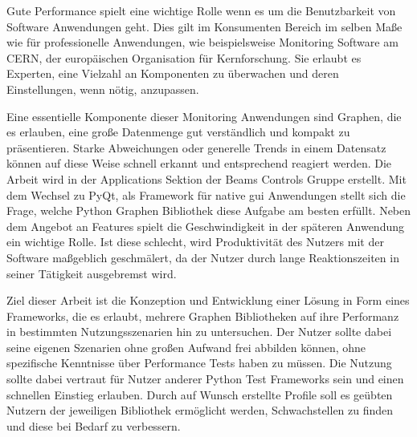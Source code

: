 

\Abstract

Gute Performance spielt eine wichtige Rolle wenn es um die  Benutzbarkeit von
Software Anwendungen geht. Dies gilt im Konsumenten Bereich im selben Maße wie
für professionelle Anwendungen, wie beispielsweise Monitoring Software am CERN,
der europäischen Organisation für Kernforschung. Sie erlaubt es Experten, eine
Vielzahl an Komponenten zu überwachen und deren Einstellungen, wenn nötig,
anzupassen.

Eine essentielle Komponente dieser Monitoring Anwendungen sind Graphen, die es
erlauben, eine große Datenmenge gut verständlich und kompakt zu präsentieren.
Starke Abweichungen oder generelle Trends in einem Datensatz können auf diese
Weise schnell erkannt und entsprechend reagiert werden. Die Arbeit wird in der
Applications Sektion der Beams Controls Gruppe erstellt. Mit dem Wechsel zu
PyQt, als Framework für native \gls{gui} Anwendungen stellt sich die Frage,
welche Python Graphen Bibliothek diese Aufgabe am besten erfüllt. Neben dem
Angebot an Features spielt die Geschwindigkeit in der späteren Anwendung ein
wichtige Rolle.  Ist diese schlecht, wird Produktivität des Nutzers mit der
Software maßgeblich geschmälert, da der Nutzer durch lange Reaktionszeiten in
seiner Tätigkeit ausgebremst wird.

Ziel dieser Arbeit ist die Konzeption und Entwicklung einer Lösung in Form eines
Frameworks, die es erlaubt, mehrere Graphen Bibliotheken auf ihre Performanz in
bestimmten Nutzungsszenarien hin zu untersuchen. Der Nutzer sollte dabei seine
eigenen Szenarien ohne großen Aufwand frei abbilden können, ohne spezifische
Kenntnisse über Performance Tests haben zu müssen. Die Nutzung sollte dabei
vertraut für Nutzer anderer Python Test Frameworks sein und einen schnellen
Einstieg erlauben. Durch auf Wunsch erstellte Profile soll es geübten Nutzern
der jeweiligen Bibliothek ermöglicht werden, Schwachstellen zu finden und diese
bei Bedarf zu verbessern.


